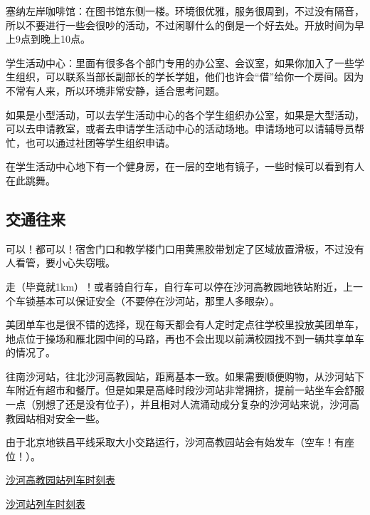 塞纳左岸咖啡馆：在图书馆东侧一楼。环境很优雅，服务很周到，不过没有隔音，所以不要进行一些会很吵的活动，不过闲聊什么的倒是一个好去处。开放时间为早上9点到晚上10点。

学生活动中心：里面有很多各个部门专用的办公室、会议室，如果你加入了一些学生组织，可以联系当部长副部长的学长学姐，他们也许会“借”给你一个房间。因为不常有人来，所以环境非常安静，适合思考问题。


如果是小型活动，可以去学生活动中心的各个学生组织办公室，如果是大型活动，可以去申请教室，或者去申请学生活动中心的活动场地。申请场地可以请辅导员帮忙，也可以通过社团等学生组织申请。


在学生活动中心地下有一个健身房，在一层的空地有镜子，一些时候可以看到有人在此跳舞。

\subsection{交通往来}


可以！都可以！宿舍门口和教学楼门口用黄黑胶带划定了区域放置滑板，不过没有人看管，要小心失窃哦。


走（毕竟就1km）！或者骑自行车，自行车可以停在沙河高教园地铁站附近，上一个车锁基本可以保证安全（不要停在沙河站，那里人多眼杂）。

美团单车也是很不错的选择，现在每天都会有人定时定点往学校里投放美团单车，地点位于操场和雁北园中间的马路，再也不会出现以前满校园找不到一辆共享单车的情况了。


往南沙河站，往北沙河高教园站，距离基本一致。如果需要顺便购物，从沙河站下车附近有超市和餐厅。但是如果是高峰时段沙河站非常拥挤，提前一站坐车会舒服一点（别想了还是没有位子），并且相对人流涌动成分复杂的沙河站来说，沙河高教园站相对安全一些。

由于北京地铁昌平线采取大小交路运行，沙河高教园站会有始发车（空车！有座位！）。

\href{https://www.bjsubway.com/station/xltcx/linecp/2013-08-26/246.html?sk=1}{沙河高教园站列车时刻表}

\href{https://www.bjsubway.com/station/xltcx/linecp/2013-08-26/249.html?sk=1}{沙河站列车时刻表}
